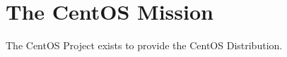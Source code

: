     \section{The CentOS Mission}
\hypertarget{sec:Concepts:CentOS:Mission}{}
      \label{sec:Concepts:CentOS:Mission}

The CentOS Project exists to provide the CentOS Distribution. 

